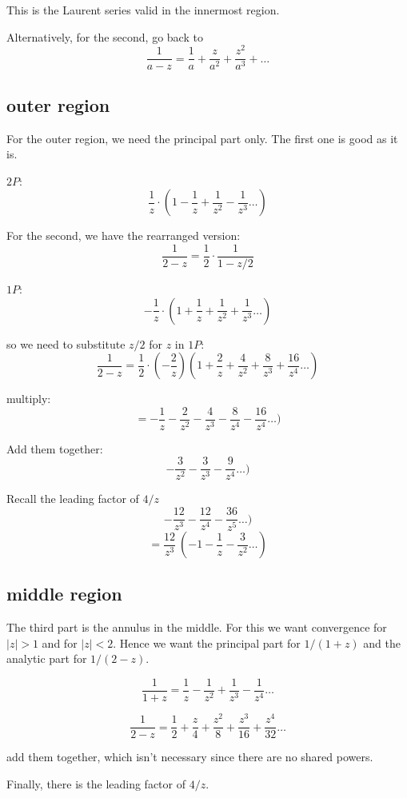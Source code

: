 \documentclass[11pt, oneside]{article}
\begin{document}
This is the Laurent series valid in the innermost region.

Alternatively, for the second, go back to
\[ \frac{1}{a - z} = \frac{1}{a} +  \frac{z}{a^2} +  \frac{z^2}{a^3} + \dots \]

\subsection*{outer region}

For the outer region, we need the principal part only.  The first one is good as it is.

$2P$:
\[ \frac{1}{z} \cdot (1 - \frac{1}{z} + \frac{1}{z^2} - \frac{1}{z^3} \dots ) \]

For the second, we have the rearranged version:
\[ \frac{1}{2 - z} = \frac{1}{2} \cdot \frac{1}{1 - z/2} \]

$1P$:
\[ -\frac{1}{z} \cdot (1 + \frac{1}{z} + \frac{1}{z^2} + \frac{1}{z^3} \dots ) \]

so we need to substitute $z/2$ for $z$ in $1P$:
\[ \frac{1}{2 - z} = \frac{1}{2} \cdot (-\frac{2}{z}) (1 + \frac{2}{z} + \frac{4}{z^2} + \frac{8}{z^3} + \frac{16}{z^4} \dots ) \]

multiply:
\[ = -\frac{1}{z} -\frac{2}{z^2} - \frac{4}{z^3} - \frac{8}{z^4} - \frac{16}{z^4} \dots ) \]

Add them together:
\[  - \frac{3}{z^2} - \frac{3}{z^3} - \frac{9}{z^4} \dots  ) \]

Recall the leading factor of $4/z$
\[ - \frac{12}{z^3} - \frac{12}{z^4} - \frac{36}{z^5} \dots )  \]
\[ = \frac{12}{z^3} \ (-1 -\frac{1}{z} - \frac{3}{z^2} \dots )\]

\subsection*{middle region}

The third part is the annulus in the middle.  For this we want convergence for $|z| > 1$ and for $|z| < 2$.  Hence we want the principal part for $1/(1+z)$ and the analytic part for $1/(2-z)$.

\[ \frac{1}{1 + z} =  \frac{1}{z} - \frac{1}{z^2} + \frac{1}{z^3} - \frac{1}{z^4} \dots \]

\[ \frac{1}{2 - z} = \frac{1}{2} + \frac{z}{4} + \frac{z^2}{8} + \frac{z^3}{16} + \frac{z^4}{32} \dots \]

add them together, which isn't necessary since there are no shared powers.

Finally, there is the leading factor of $4/z$.
\end{document}
